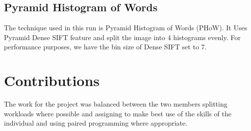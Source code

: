 \documentclass[paper=a4, fontsize=11pt]{article}
\begin{document}
\subsection{Pyramid Histogram of Words}

The technique used in this run is Pyramid Histogram of Words (PHoW). It Uses Pyramid Dense SIFT feature and split the image into 4 histograms evenly. For performance purposes, we have the bin size of Dense SIFT set to 7.

\section{Contributions}

The work for the project was balanced between the two members splitting workloads where possible and assigning to make best use of the skills of the individual and using paired programming where appropriate.
\end{document}
